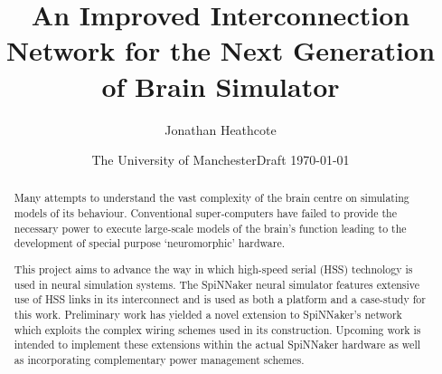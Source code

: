 \documentclass[a4paper,12pt,titlepage]{report}
\title{An Improved Interconnection Network for the Next Generation of Brain Simulator}
\author{Jonathan Heathcote}
\date{The University of Manchester}
\date{Draft \today}
\begin{document}
	
	\maketitle
	
	\begin{abstract}
		
		Many attempts to understand the vast complexity of the brain centre on
		simulating models of its behaviour. Conventional super-computers have failed
		to provide the necessary power to execute large-scale models of the brain's
		function leading to the development of special purpose `neuromorphic'
		hardware.
		
		This project aims to advance the way in which high-speed serial (HSS)
		technology is used in neural simulation systems. The SpiNNaker neural
		simulator features extensive use of HSS links in its interconnect and is
		used as both a platform and a case-study for this work. Preliminary work has
		yielded a novel extension to SpiNNaker's network which exploits the complex
		wiring schemes used in its construction.  Upcoming work is intended to
		implement these extensions within the actual SpiNNaker hardware as well as
		incorporating complementary power management schemes.
		
	\end{abstract}
	
	\tableofcontents
	\listoffigures
	
	
	
	
	
	
	
	
	
	
\end{document}
